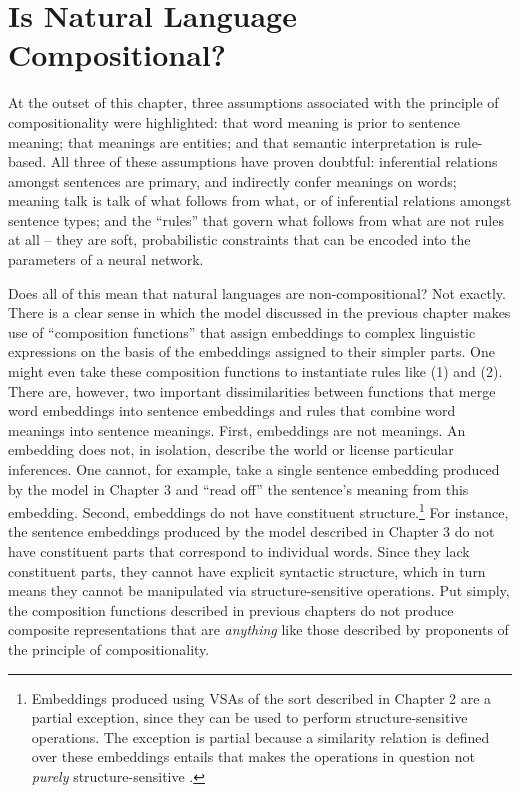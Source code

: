 \section{Is Natural Language Compositional?}

At the outset of this chapter, three assumptions associated with the principle of compositionality were highlighted: that word meaning is prior to sentence meaning; that meanings are entities; and that semantic interpretation is rule-based. All three of these assumptions have proven doubtful: inferential relations amongst sentences are primary, and indirectly confer meanings on words; meaning talk is talk of what follows from what, or of inferential relations amongst sentence types; and the ``rules'' that govern what follows from what are not rules at all -- they are soft, probabilistic constraints that can be encoded into the parameters of a neural network. 

Does all of this mean that natural languages are non-compositional? Not exactly. There is a clear sense in which the model discussed in the previous chapter makes use of ``composition functions'' that assign embeddings to complex linguistic expressions on the basis of the embeddings assigned to their simpler parts. One might even take these composition functions to instantiate rules like (1) and (2). There are, however, two important dissimilarities between functions that merge word embeddings into sentence embeddings and rules that combine word meanings into sentence meanings. First, embeddings are not meanings. An embedding does not, in isolation, describe the world or license particular inferences. One cannot, for example, take a single sentence embedding produced by the model in Chapter 3 and ``read off'' the sentence's meaning from this embedding. Second, embeddings do not have constituent structure.\footnote{Embeddings produced using VSAs of the sort described in Chapter 2 are a partial exception, since they can be used to perform structure-sensitive operations. The exception is partial because a similarity relation is defined over these embeddings entails that makes the operations in question not \textit{purely} structure-sensitive \citep{Plate:2003,Eliasmith:2013}.} For instance, the sentence embeddings produced by the model described in Chapter 3 do not have constituent parts that correspond to individual words. Since they lack constituent parts, they cannot have explicit syntactic structure, which in turn means they cannot be manipulated via structure-sensitive operations. Put simply, the composition functions described in previous chapters do not produce composite representations that are \textit{anything} like those described by proponents of the principle of compositionality.

